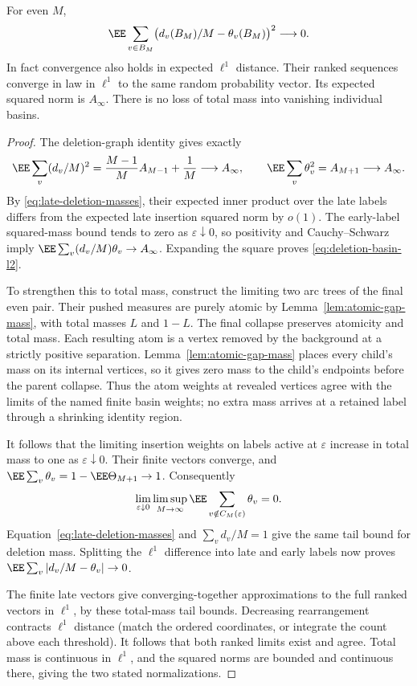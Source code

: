 \documentclass[11pt,letterpaper]{article}
\begin{document}
\begin{corollary}
\label{cor:deletion-basin}
For even $M$,
\begin{equation}\label{eq:deletion-basin-l2}
 \EE\sum_{v\in B_M}
      \bigl(d_v(B_M)/M-\theta_v(B_M)\bigr)^2\longrightarrow0.
\end{equation}
In fact convergence also holds in expected $\ell^1$ distance.
Their ranked sequences converge in law in $\ell^1$ to the same
random probability vector. Its expected squared norm is $A_\infty$.
There is no loss of total mass into vanishing individual basins.
\end{corollary}
\begin{proof}
The deletion-graph identity gives exactly
\[
 \EE\sum_v(d_v/M)^2
    =\frac{M-1}{M}A_{M-1}+\frac1M\longrightarrow A_\infty,
 \qquad
 \EE\sum_v\theta_v^2=A_{M+1}\longrightarrow A_\infty.
\]
By \eqref{eq:late-deletion-masses}, their expected inner product
over the late labels differs from the expected late insertion
squared norm by $o(1)$. The early-label squared-mass bound tends
to zero as $\varepsilon\downarrow0$, so positivity and
Cauchy--Schwarz imply
$\EE\sum_v(d_v/M)\theta_v\to A_\infty$.
Expanding the square proves \eqref{eq:deletion-basin-l2}.

To strengthen this to total mass, construct the limiting two arc
trees of the final even pair. Their pushed measures are purely
atomic by Lemma~\ref{lem:atomic-gap-mass}, with total masses $L$
and $1-L$. The final collapse preserves atomicity and total mass.
Each resulting atom is a vertex removed by the background at a
strictly positive separation. Lemma~\ref{lem:atomic-gap-mass}
places every child's mass on its internal vertices, so it gives
zero mass to the child's endpoints before the parent collapse. Thus the atom
weights at revealed vertices agree with the limits of the named
finite basin weights; no extra mass arrives at a retained label
through a shrinking identity region.

It follows that the limiting insertion weights on labels active
at $\varepsilon$ increase in total mass to one as
$\varepsilon\downarrow0$. Their finite vectors converge, and
$\EE\sum_v\theta_v=1-\EE\Theta_{M+1}\to1$.
Consequently
\[
 \lim_{\varepsilon\downarrow0}\limsup_{M\to\infty}
 \EE\sum_{v\notin C_M(\varepsilon)}\theta_v=0.
\]
Equation~\eqref{eq:late-deletion-masses} and $\sum_vd_v/M=1$
give the same tail bound for deletion mass. Splitting the
$\ell^1$ difference into late and early labels now proves
$\EE\sum_v|d_v/M-\theta_v|\to0$.

The finite late vectors give converging-together approximations
to the full ranked vectors in $\ell^1$, by these total-mass tail
bounds. Decreasing rearrangement contracts $\ell^1$ distance
(match the ordered coordinates, or integrate the count above each
threshold). It follows that both ranked limits exist and agree.
Total mass is continuous in $\ell^1$, and the squared norms are
bounded and continuous there, giving the two stated normalizations.
\end{proof}
\end{document}
